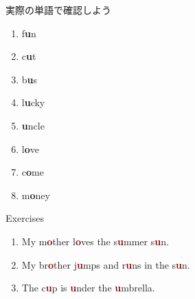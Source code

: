 \documentclass[aspectratio=169,xcolor={dvipsnames,table}]{beamer}
\begin{document}
\begin{frame}[plain]{実際の単語で確認しよう}
\LARGE

\begin{enumerate}
 \item f\textcolor{NavyBlue}{\bfseries u}n%
\hfill{}\hspace{150pt}\mbox{}
 \item c\textcolor{NavyBlue}{\bfseries u}t%
\hfill{}\hspace{150pt}\mbox{}
 \item b\textcolor{NavyBlue}{\bfseries u}s%
\hfill{}\hspace{150pt}\mbox{}
 \item l\textcolor{NavyBlue}{\bfseries u}cky%
\hfill{}\hspace{150pt}\mbox{}
 \item \textcolor{NavyBlue}{\bfseries u}ncle%
\hfill{}\hspace{150pt}\mbox{}
 \item l\textcolor{NavyBlue}{\bfseries o}ve%
\hfill{}\hspace{150pt}\mbox{} 
\item c\textcolor{NavyBlue}{\bfseries o}me%
\hfill{}\hspace{150pt}\mbox{}
 \item m\textcolor{NavyBlue}{\bfseries o}ney%
\hfill{}\hspace{150pt}\mbox{}
\end{enumerate}
\end{frame}
\begin{frame}[plain]{Exercises}
\LARGE

\begin{enumerate}
 \item My m\textcolor{Maroon}{\bfseries o}ther l\textcolor{Maroon}{\bfseries o}ves the s\textcolor{Maroon}{\bfseries u}mmer s\textcolor{Maroon}{\bfseries u}n.
 \item My br\textcolor{Maroon}{\bfseries o}ther j\textcolor{Maroon}{\bfseries u}mps and r\textcolor{Maroon}{\bfseries u}ns in the s\textcolor{Maroon}{\bfseries u}n.
 \item The c\textcolor{Maroon}{\bfseries u}p is \textcolor{Maroon}{\bfseries u}nder the \textcolor{Maroon}{\bfseries u}mbrella.
\end{enumerate}
\end{frame}
\end{document}
